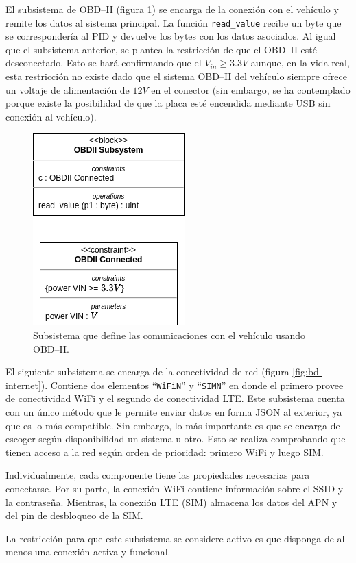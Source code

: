 El subsistema de \ac{OBD}--II (figura \ref{fig:bd-obd}) se encarga de la conexión con
el vehículo y remite los datos al sistema principal. La función \texttt{read\_value}
recibe un byte que se correspondería al \ac{PID} y devuelve los bytes con los datos
asociados. Al igual que el subsistema anterior, se plantea la restricción de que
el \ac{OBD}--II esté desconectado. Esto se hará confirmando que el $V_{in} \ge 3.3V$
aunque, en la vida real, esta restricción no existe dado que el sistema \ac{OBD}--II
del vehículo siempre ofrece un voltaje de alimentación de $12V$ en el conector (sin embargo, se ha contemplado
porque existe la posibilidad de que la placa esté encendida mediante USB sin
conexión al vehículo).

\begin{figure}[H]
  \centering
  \includegraphics[width=.3\linewidth]{images/BD-OBD.png}
  \caption{Subsistema que define las comunicaciones con el vehículo usando \ac{OBD}--II.}
  \label{fig:bd-obd}
\end{figure}

El siguiente subsistema se encarga de la conectividad de red (figura \ref{fig:bd-internet}).
Contiene dos elementos ``\texttt{WiFiN}'' y ``\texttt{SIMN}'' en donde el primero
provee de conectividad WiFi y el segundo de conectividad \ac{LTE}. Este subsistema
cuenta con un único método que le permite enviar datos en forma JSON al exterior,
ya que es lo más compatible. Sin embargo, lo más importante es que se encarga de
escoger según disponibilidad un sistema u otro. Esto se realiza comprobando que
tienen acceso a la red según orden de prioridad: primero WiFi y luego SIM.

Individualmente, cada componente tiene las propiedades necesarias para conectarse.
Por su parte, la conexión WiFi contiene información sobre el SSID y la contraseña.
Mientras, la conexión \ac{LTE} (SIM) almacena los datos del APN y del pin de
desbloqueo de la SIM.

La restricción para que este subsistema se considere activo es que disponga de al
menos una conexión activa y funcional.

